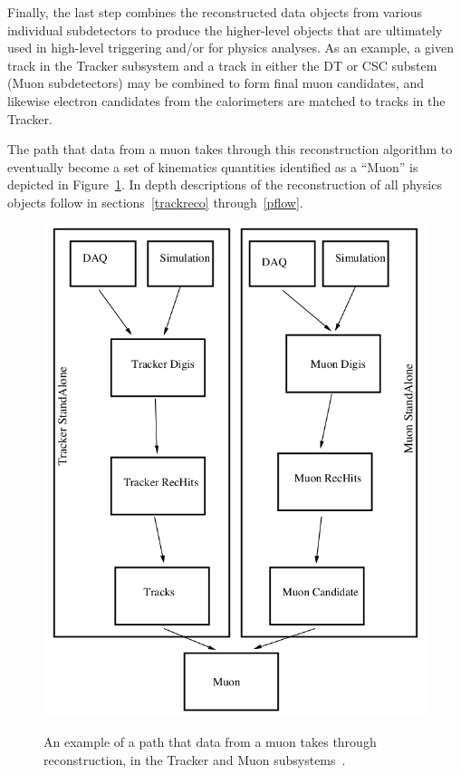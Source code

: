 Finally, the last step combines the reconstructed data objects from various individual subdetectors to produce the higher-level objects that are ultimately used in high-level triggering and/or for physics analyses.  As an example, a given track in the Tracker subsystem and a track in either the DT or CSC substem (Muon subdetectors) may be combined to form final muon candidates, and likewise electron candidates from the calorimeters are matched to tracks in the Tracker.  

The path that data from a muon takes through this reconstruction algorithm to eventually become a set of kinematics quantities identified as a ``Muon'' is depicted in Figure~\ref{figapp:CMSReco}.  In depth descriptions of the reconstruction of all physics objects follow in sections~\ref{trackreco} through~\ref{pflow}.

\begin{figure}[!Hh]
       \centering
       \includegraphics[scale=0.6]{Figures/CMSReco.png} \\
       \caption[A diagram of reconstruction of a muon in CMS.]{An example of a path that data from a muon takes through reconstruction, in the Tracker and Muon subsystems~\cite{CMStdr}.}
\label{figapp:CMSReco}
\end{figure}



